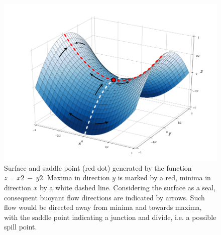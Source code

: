			\begin{figure}[h]
				\centering
				\includegraphics[width=1\textwidth]{Figures/Saddle_point_flow}
				\caption{Surface and saddle point (red dot) generated by the function $z=x2~-~y2$. Maxima in direction $y$ is marked by a red, minima in direction $x$ by a white dashed line. Considering the surface as a seal, consequent buoyant flow directions are indicated by arrows. Such flow would be directed away from minima and towards maxima, with the saddle point indicating a junction and divide, i.e. a possible spill point.}\label{fig:saddle_point_flow}
			\end{figure}
